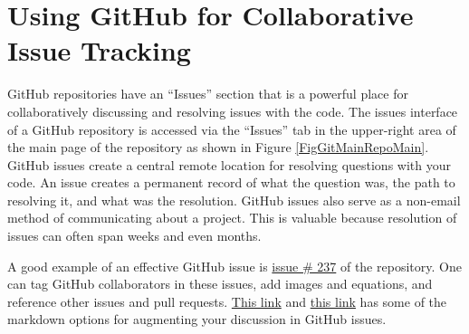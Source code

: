 \section{Using GitHub for Collaborative Issue Tracking}\label{SecGitIssues}

  GitHub repositories have an ``Issues'' section that is a powerful place for collaboratively discussing and resolving issues with the code. The issues interface of a GitHub repository is accessed via the ``Issues'' tab in the upper-right area of the main page of the repository as shown in Figure \ref{FigGitMainRepoMain}. GitHub issues create a central remote location for resolving questions with your code. An issue creates a permanent record of what the question was, the path to resolving it, and what was the resolution. GitHub issues also serve as a non-email method of communicating about a project. This is valuable because resolution of issues can often span weeks and even months.

  A good example of an effective GitHub issue is \href{https://github.com/open-source-economics/OG-USA/issues/237}{issue \# 237} of the \href{https://github.com/open-source-economics/OG-USA}{\ogindia} repository. One can tag GitHub collaborators in these issues, add images and equations, and reference other issues and pull requests. \href{https://help.github.com/articles/working-with-advanced-formatting/}{This link} and \href{https://github.com/adam-p/markdown-here/wiki/Markdown-Cheatsheet}{this link} has some of the markdown options for augmenting your discussion in GitHub issues.

